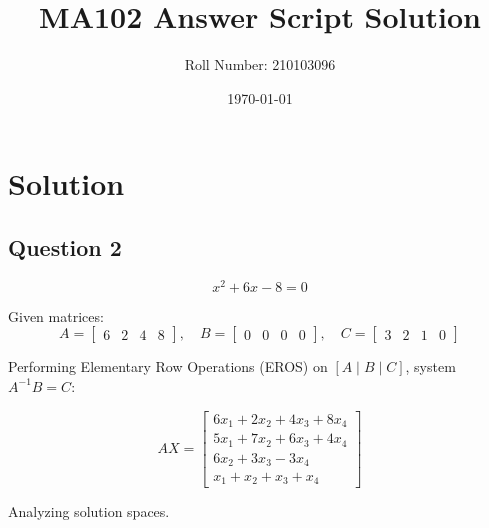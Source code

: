 \documentclass[12pt]{article}
\title{MA102 Answer Script Solution}
\author{Roll Number: 210103096}
\date{\today}
\begin{document}
\maketitle
\section*{Solution}

\subsection*{Question 2}
\[ x^2 + 6x - 8 = 0 \]

Given matrices:
\[ A = \begin{bmatrix} 6 & 2 & 4 & 8 \end{bmatrix}, \quad B = \begin{bmatrix} 0 & 0 & 0 & 0 \end{bmatrix}, \quad C = \begin{bmatrix} 3 & 2 & 1 & 0 \end{bmatrix} \]

Performing Elementary Row Operations (EROS) on $[A \mid B \mid C]$, system $A^{-1} B = C$:

\[
AX = \begin{bmatrix}
6x_1 + 2x_2 + 4x_3 + 8x_4 \\
5x_1 + 7x_2 + 6x_3 + 4x_4 \\
6x_2 + 3x_3 - 3x_4 \\
x_1 + x_2 + x_3 + x_4
\end{bmatrix}
\]

Analyzing solution spaces.
\end{document}
